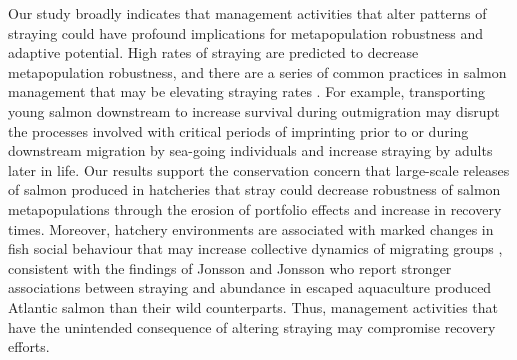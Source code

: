\documentclass{revtex4}
\begin{document}
Our study broadly indicates that management activities that alter patterns of straying could have profound implications for metapopulation robustness and adaptive potential. 
High rates of straying are predicted to decrease metapopulation robustness, and there are a series of common practices in salmon management that may be elevating straying rates \citep{Ford:2002ip,Brenner:2012gl}.
For example, transporting young salmon downstream to increase survival during outmigration may disrupt the processes involved with critical periods of imprinting prior to or during downstream migration by sea-going individuals and increase straying by adults later in life. 
Our results support the conservation concern that large-scale releases of salmon produced in hatcheries that stray could decrease robustness of salmon metapopulations through the erosion of portfolio effects and increase in recovery times. 
Moreover, hatchery environments are associated with marked changes in fish social behaviour that may increase collective dynamics of migrating groups \citep{Ruzzante:1994bu}, consistent with the findings of Jonsson and Jonsson \citep{Jonsson:2011kg} who report stronger associations between straying and abundance in escaped aquaculture produced Atlantic salmon than their wild counterparts. 
Thus, management activities that have the unintended consequence of altering straying may compromise recovery efforts.

\end{document}
